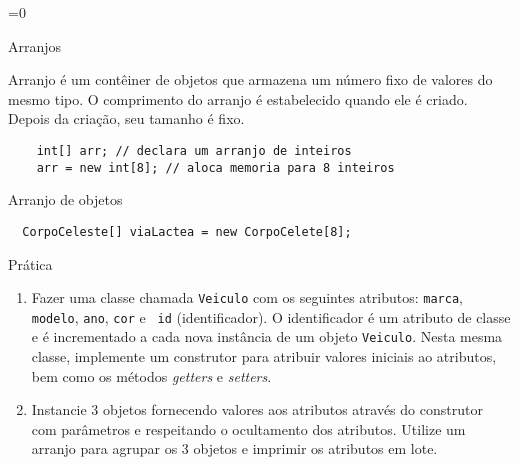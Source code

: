 \lecturetitle{\insertlecture}{\course}
\maketitle


=0
\begin{frame}[fragile]{Arranjos}

  \begin{definition}
    Arranjo é um contêiner de objetos que armazena um número fixo de
    valores do mesmo tipo. O comprimento do arranjo é estabelecido
    quando ele é criado. Depois da criação, seu tamanho é fixo.
  \end{definition}

  \begin{lstlisting}
    int[] arr; // declara um arranjo de inteiros
    arr = new int[8]; // aloca memoria para 8 inteiros
  \end{lstlisting}

Arranjo de objetos

\begin{lstlisting}
  CorpoCeleste[] viaLactea = new CorpoCelete[8]; 
\end{lstlisting}

  
\end{frame}

\large
\begin{frame}{Prática}
  \begin{enumerate}
  \item Fazer uma classe chamada {\tt Veiculo} com os seguintes
    atributos: {\tt marca}, {\tt modelo}, {\tt ano}, {\tt cor} e {\tt
      id} (identificador). O identificador é um atributo de classe e é
    incrementado a cada nova instância de um objeto {\tt Veiculo}.
    Nesta mesma classe, implemente um construtor para atribuir valores
    iniciais ao atributos, bem como os métodos {\it getters} e {\it
      setters}.
  \item Instancie 3 objetos fornecendo valores aos atributos através
    do construtor com parâmetros e respeitando o ocultamento dos
    atributos. Utilize um arranjo para agrupar os 3 objetos e imprimir
    os atributos em lote.
  \end{enumerate}
  
\end{frame}
\fi

